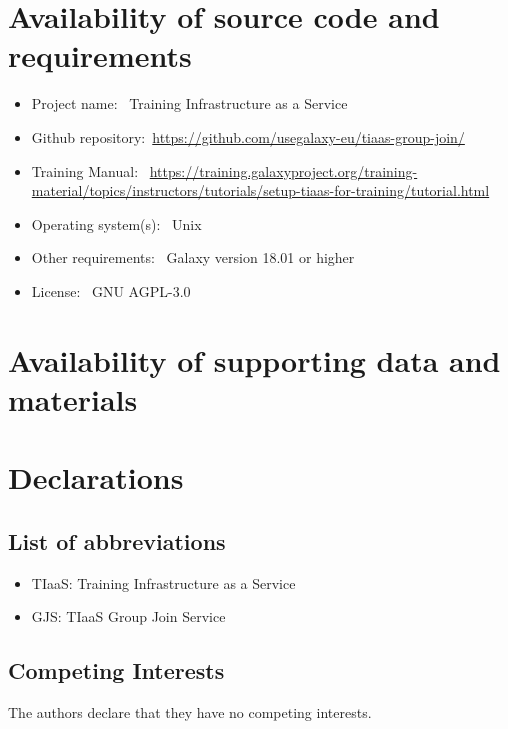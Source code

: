 \documentclass[a4paper,num-refs]{oup-contemporary}
\begin{document}
\section{Availability of source code and requirements}

\begin{itemize}
\item Project name: ~Training Infrastructure as a Service
\item Github repository:~\url{https://github.com/usegalaxy-eu/tiaas-group-join/}
\item Training Manual: ~\url{https://training.galaxyproject.org/training-material/topics/instructors/tutorials/setup-tiaas-for-training/tutorial.html}
\item Operating system(s): ~Unix
\item Other requirements: ~Galaxy version 18.01 or higher
\item License: ~GNU AGPL-3.0
\end{itemize}

\section{Availability of supporting data and materials}



\section{Declarations}

\subsection{List of abbreviations}

\begin{itemize}
\item TIaaS: Training Infrastructure as a Service
\item GJS: TIaaS Group Join Service
\end{itemize}


\subsection{Competing Interests}

The authors declare that they have no competing interests.
\end{document}
